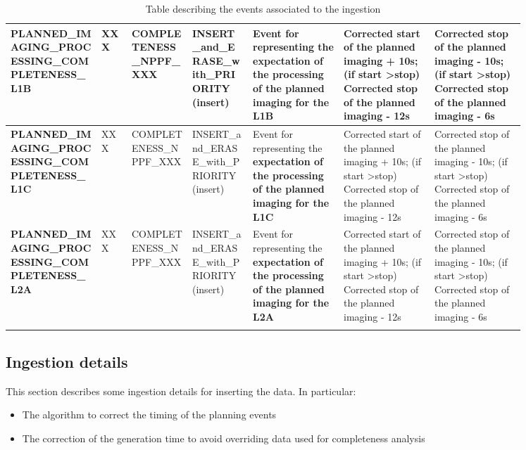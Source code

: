 \begin{landscape}
\begin{longtable}{|M{0.15\linewidth}|M{0.05\linewidth}|M{0.10\linewidth}|M{0.10\linewidth}|M{0.15\linewidth}|M{0.15\linewidth}|M{0.15\linewidth}|}
\textbf{PLANNED\_IMAGING\_PROCESSING\_COMPLETENESS\_L1B} & XXX & \- COMPLETENESS\_NPPF\_XXX & INSERT\_and\_ERASE\_with\_PRIORITY (insert) & Event for representing the \textbf{expectation of the processing of the planned imaging for the L1B} & Corrected start of the planned imaging + 10s; (if start \textgreater  stop) Corrected stop of the planned imaging - 12s & Corrected stop of the planned imaging - 10s; (if start \textgreater  stop) Corrected stop of the planned imaging - 6s \\ \hline
\textbf{PLANNED\_IMAGING\_PROCESSING\_COMPLETENESS\_L1C} & XXX & \- COMPLETENESS\_NPPF\_XXX & INSERT\_and\_ERASE\_with\_PRIORITY (insert) & Event for representing the \textbf{expectation of the processing of the planned imaging for the L1C} & Corrected start of the planned imaging + 10s; (if start \textgreater  stop) Corrected stop of the planned imaging - 12s & Corrected stop of the planned imaging - 10s; (if start \textgreater  stop) Corrected stop of the planned imaging - 6s \\ \hline
\textbf{PLANNED\_IMAGING\_PROCESSING\_COMPLETENESS\_L2A} & XXX & \- COMPLETENESS\_NPPF\_XXX & INSERT\_and\_ERASE\_with\_PRIORITY (insert) & Event for representing the \textbf{expectation of the processing of the planned imaging for the L2A} & Corrected start of the planned imaging + 10s; (if start \textgreater  stop) Corrected stop of the planned imaging - 12s & Corrected stop of the planned imaging - 10s; (if start \textgreater  stop) Corrected stop of the planned imaging - 6s \\ \hline
\caption{Table describing the events associated to the ingestion}
\label{tb:description_events_ingestion_orbpre}
\end{longtable}
\end{landscape}

\subsection{Ingestion details}

This section describes some ingestion details for inserting the data. In particular:

\begin{itemize} 

\item The algorithm to correct the timing of the planning events

\item The correction of the generation time to avoid overriding data used for completeness analysis
  
\end{itemize}

